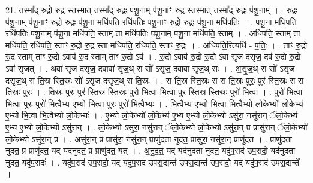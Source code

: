 \documentclass[17pt]{extarticle}
\begin{document}
21. तस्मा᳚द् रु॒द्रो रु॒द्र स्तस्मा॒त् तस्मा᳚द् रु॒द्रः प॑शू॒नाम् प॑शू॒नाꣳ रु॒द्र स्तस्मा॒त् तस्मा᳚द् रु॒द्रः प॑शू॒नाम् । . रु॒द्रः प॑शू॒नाम् प॑शू॒नाꣳ रु॒द्रो रु॒द्रः प॑शू॒ना मधि॑पति॒ रधि॑पतिः पशू॒नाꣳ रु॒द्रो रु॒द्रः प॑शू॒ना मधि॑पतिः । . प॒शू॒ना मधि॑पति॒ रधि॑पतिः पशू॒नाम् प॑शू॒ना मधि॑पति॒ स्ताम् ता मधि॑पतिः पशू॒नाम् प॑शू॒ना मधि॑पति॒ स्ताम् । . अधि॑पति॒ स्ताम् ता मधि॑पति॒ रधि॑पति॒ स्ताꣳ रु॒द्रो रु॒द्र स्ता मधि॑पति॒ रधि॑पति॒ स्ताꣳ रु॒द्रः । . अधि॑पति॒रित्यधि॑ - प॒तिः॒ । . ताꣳ रु॒द्रो रु॒द्र स्ताम् ताꣳ रु॒द्रो ऽवाव॑ रु॒द्र स्ताम् ताꣳ रु॒द्रो ऽव॑ । . रु॒द्रो ऽवाव॑ रु॒द्रो रु॒द्रो ऽवा॑ सृज दसृज॒ दव॑ रु॒द्रो रु॒द्रो ऽवा॑ सृजत् । . अवा॑ सृज दसृज॒ दवावा॑ सृज॒थ् स सो॑ ऽसृज॒ दवावा॑ सृज॒थ् सः । . अ॒सृ॒ज॒थ् स सो॑ ऽसृज दसृज॒थ् स ति॒स्र स्ति॒स्रः सो॑ ऽसृज दसृज॒थ् स ति॒स्रः । . स ति॒स्र स्ति॒स्रः स स ति॒स्रः पुरः॒ पुर॑ स्ति॒स्रः स स ति॒स्रः पुरः॑ । . ति॒स्रः पुरः॒ पुर॑ स्ति॒स्र स्ति॒स्रः पुरो॑ भि॒त्वा भि॒त्वा पुर॑ स्ति॒स्र स्ति॒स्रः पुरो॑ भि॒त्वा । . पुरो॑ भि॒त्वा भि॒त्वा पुरः॒ पुरो॑ भि॒त्वैभ्य ए॒भ्यो भि॒त्वा पुरः॒ पुरो॑ भि॒त्वैभ्यः । . भि॒त्वैभ्य ए॒भ्यो भि॒त्वा भि॒त्वैभ्यो लो॒केभ्यो॑ लो॒केभ्य॑ ए॒भ्यो भि॒त्वा भि॒त्वैभ्यो लो॒केभ्यः॑ । . ए॒भ्यो लो॒केभ्यो॑ लो॒केभ्य॑ ए॒भ्य ए॒भ्यो लो॒केभ्यो ऽसु॑रा॒ नसु॑रान् ॅलो॒केभ्य॑ ए॒भ्य ए॒भ्यो लो॒केभ्यो ऽसु॑रान् । . लो॒केभ्यो ऽसु॑रा॒ नसु॑रान् ॅलो॒केभ्यो॑ लो॒केभ्यो ऽसु॑रा॒न् प्र प्रासु॑रान् ॅलो॒केभ्यो॑ लो॒केभ्यो ऽसु॑रा॒न् प्र । . असु॑रा॒न् प्र प्रासु॑रा॒ नसु॑रा॒न् प्राणु॑दता नुदत॒ प्रासु॑रा॒ नसु॑रा॒न् प्राणु॑दत । . प्राणु॑दता नुदत॒ प्र प्राणु॑दत॒ यद् यद॑नुदत॒ प्र प्राणु॑दत॒ यत् । . अ॒नु॒द॒त॒ यद् यद॑नुदता नुदत॒ यदु॑प॒सद॑ उप॒सदो॒ यद॑नुदता नुदत॒ यदु॑प॒सदः॑ । . यदु॑प॒सद॑ उप॒सदो॒ यद् यदु॑प॒सद॑ उपस॒द्यन्त॑ उपस॒द्यन्त॑ उप॒सदो॒ यद् यदु॑प॒सद॑ उपस॒द्यन्ते᳚ । \newline
\end{document}
